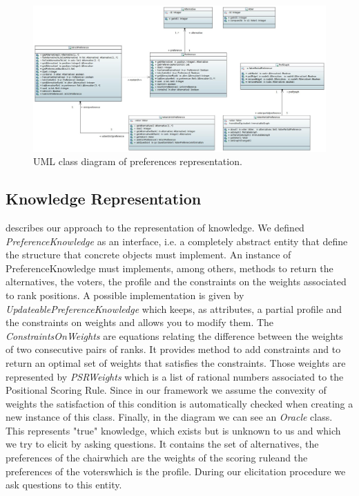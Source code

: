 \begin{figure}
	\centering
	\includegraphics[width=\textwidth]{uml/basic.jpeg}
	\caption{UML class diagram of preferences representation.}
	\label{uml:preference}
\end{figure}

\subsection{Knowledge Representation}

 describes our approach to the representation of knowledge. We defined \textit{PreferenceKnowledge} as an interface, i.e. a completely abstract entity that define the structure that concrete objects must implement. An instance of PreferenceKnowledge must implements, among others, methods to return the alternatives, the voters, the profile and the constraints on the weights associated to rank positions.
A possible implementation is given by \textit{UpdateablePreferenceKnowledge} which keeps, as attributes, a partial profile and the constraints on weights and allows you to modify them. The \textit{ConstraintsOnWeights} are equations relating the difference between the weights of two consecutive pairs of ranks. It provides method to add constraints and to return an optimal set of weights that satisfies the constraints. Those weights are represented by \textit{PSRWeights} which is a list of rational numbers associated to the Positional Scoring Rule. Since in our framework we assume the convexity of weights the satisfaction of this condition is automatically checked when creating a new instance of this class.
Finally, in the diagram we can see an \textit{Oracle} class. This represents "true" knowledge, which exists but is unknown to us and which we try to elicit by asking questions. It contains the set of alternatives, the preferences of the chair\textemdash which are the weights of the scoring rule\textemdash and the preferences of the voters\textemdash which is the profile. During our elicitation procedure we ask questions to this entity.

